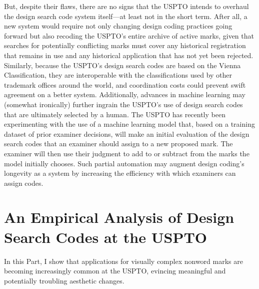 \documentclass[letterpaper, 11pt, oneside]{article}
\begin{document}
But, despite their flaws, there are no signs that the USPTO intends to overhaul the design search code system itself—at least not in the short term. After all, a new system would require not only changing design coding practices going forward but also recoding the USPTO's entire archive of active marks, given that searches for potentially conflicting marks must cover any historical registration that remains in use and any historical application that has not yet been rejected. Similarly, because the USPTO's design search codes are based on the Vienna Classification, they are interoperable with the classifications used by other trademark offices around the world, and coordination costs could prevent swift agreement on a better system. Additionally, advances in machine learning may (somewhat ironically) further ingrain the USPTO's use of design search codes that are ultimately selected by a human. The USPTO has recently been experimenting with the use of a machine learning model that, based on a training dataset of prior examiner decisions, will make an initial evaluation of the design search codes that an examiner should assign to a new proposed mark. The examiner will then use their judgment to add to or subtract from the marks the model initially chooses. Such partial automation may augment design coding's longevity as a system by increasing the efficiency with which examiners can assign codes.

\section{An Empirical Analysis of Design Search Codes at the USPTO}\label{sec:2}

In this Part, I show that applications for visually complex nonword marks are becoming increasingly common at the USPTO, evincing meaningful and potentially troubling aesthetic changes.
\end{document}
